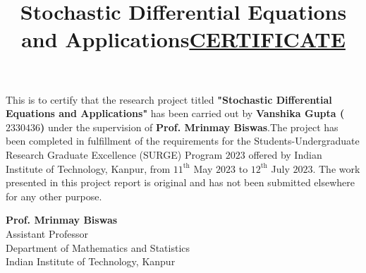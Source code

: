\documentclass[twoside,final]{hcmut-report}
\title{Stochastic Differential Equations and Applications}
\begin{document}
\coverpage
%


\title{\centering \textbf{\underline{CERTIFICATE}}}
\author{}
\date{}

\maketitle

This is to certify that the research project titled \textbf{"Stochastic Differential Equations and Applications"} has been carried out by \textbf{Vanshika Gupta ($2330436$)} under the supervision of \textbf{Prof. Mrinmay Biswas}.The project has been completed in fulfillment of the requirements for the Students-Undergraduate Research Graduate Excellence (SURGE) Program $2023$ offered by Indian Institute of Technology, Kanpur, from $11^{\text{th}}$ May $2023$ to $12^{\text{th}}$ July $2023$. The work presented in this project report is original and has not been submitted elsewhere for any other purpose.

\vspace{5cm}

\begin{flushright}
\textbf{Prof. Mrinmay Biswas}\\
Assistant Professor\\
Department of Mathematics and Statistics\\
Indian Institute of Technology, Kanpur
\end{flushright}
\end{document}
